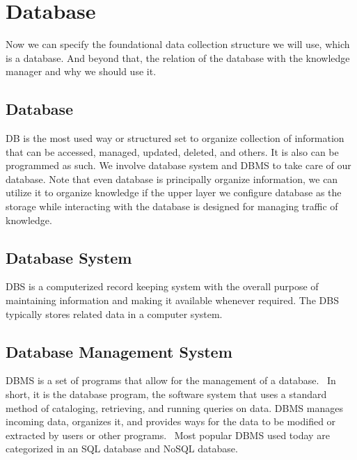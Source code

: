 \section{Database}
\label{sec:database}

Now we can specify the foundational data collection structure we will use, which is a database. And beyond that, the relation of the database with the knowledge manager and why we should use it.

\subsection{Database}
\label{ssec:database}

\ac{DB} is the most used way or structured set to organize collection of information that can be accessed, managed, updated, deleted, and others.
It is also can be programmed as such.
We involve database system and \ac{DBMS} to take care of our database.
Note that even database is principally organize information, we can utilize it to organize knowledge if the upper layer we configure database as the storage while interacting with the database is designed for managing traffic of knowledge.

\subsection{Database System}
\label{ssec:database-system}

\ac{DBS} is a computerized record keeping system with the overall purpose of maintaining information and making it available whenever required.
The \ac{DBS} typically stores related data in a computer system.~\autocite{Foster2014Intro}

\subsection{Database Management System}
\label{ssec:dbms}

\ac{DBMS} is a set of programs that allow for the
management of a database.~\autocite{Foster2014Intro}
In short, it is the database program, the software system that uses a standard method of cataloging, retrieving, and running queries on data. \ac{DBMS} manages incoming data, organizes it, and provides ways for the data to be modified or extracted by users or other programs.~\autocite{TechTerms:2014:DBMS}
Most popular \ac{DBMS} used today are categorized in an \ac{SQL} database and \ac{NoSQL} database.

